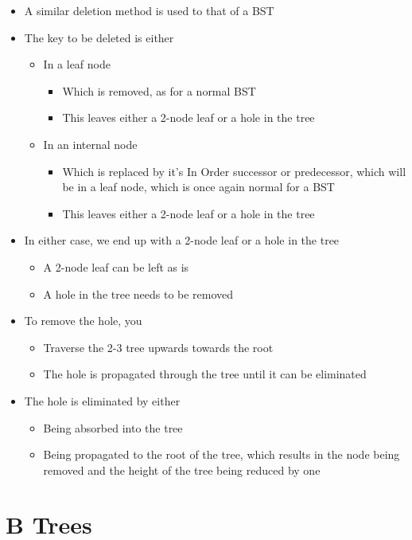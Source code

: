 \begin{itemize}
  \item A similar deletion method is used to that of a BST
  \item The key to be deleted is either
  \begin{itemize}
    \item In a leaf node
    \begin{itemize}
      \item Which is removed, as for a normal BST
      \item This leaves either a 2-node leaf or a hole in the tree
    \end{itemize}
    \item In an internal node
    \begin{itemize}
      \item Which is replaced by it's In Order successor or predecessor, which will be in a leaf node, which is once again normal for a BST
      \item This leaves either a 2-node leaf or a hole in the tree
    \end{itemize}
  \end{itemize}
  \item In either case, we end up with a 2-node leaf or a hole in the tree
  \begin{itemize}
    \item A 2-node leaf can be left as is
    \item A hole in the tree needs to be removed
  \end{itemize}
  \item To remove the hole, you
  \begin{itemize}
    \item Traverse the 2-3 tree upwards towards the root
    \item The hole is propagated through the tree until it can be eliminated
  \end{itemize}
  \item The hole is eliminated by either
  \begin{itemize}
    \item Being absorbed into the tree
    \item Being propagated to the root of the tree, which results in the node being removed and the height of the tree being reduced by one
  \end{itemize}
\end{itemize}

\section*{B Trees}

